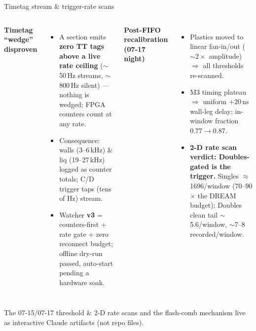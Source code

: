 \documentclass[aspectratio=169,10pt]{beamer}
\newcommand{\hl}[1]{{\color{TealD}\textbf{#1}}}
\begin{document}
\begin{frame}{Timetag stream \& trigger-rate scans}
\small
\begin{columns}[T]
\textbf{\color{TealD}Timetag ``wedge'' disproven}
\begin{itemize}\setlength\itemsep{2pt}
  \item A section emits \hl{zero TT tags above a live rate ceiling} ($\sim$50\,Hz streams, $\sim$800\,Hz silent) --- nothing is wedged; FPGA counters count at any rate.
  \item Consequence: walls (3--6\,kHz) \& liq (19--27\,kHz) logged as counter totals; C/D trigger taps (tens of Hz) stream.
  \item Watcher \hl{v3} = counters-first + rate gate + zero reconnect budget; offline dry-run passed, auto-start pending a hardware soak.
\end{itemize}
\textbf{\color{TealD}Post-FIFO recalibration (07-17 night)}
\begin{itemize}\setlength\itemsep{2pt}
  \item Plastics moved to linear fan-in/out ($\sim2\times$ amplitude) $\Rightarrow$ all thresholds re-scanned.
  \item M3 timing plateau $\Rightarrow$ uniform $+20$\,ns wall-leg delay; in-window fraction $0.77\to0.87$.
  \item \hl{2-D rate scan verdict: Doubles-gated is the trigger.} Singles $\approx$1696/window (70--90$\times$ the DREAM budget); Doubles clean tail $\sim$5.6/window, $\sim$7--8 recorded/window.
\end{itemize}
\end{columns}
\vspace{2pt}
{\color{SlateL}\scriptsize The 07-15/07-17 threshold \& 2-D rate scans and the flash-comb mechanism live as interactive Claude artifacts (not repo files).}
\end{frame}
\end{document}
